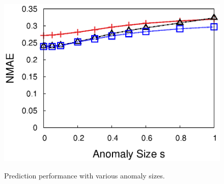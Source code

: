 \begin{figure}[h!]
{{    \includegraphics[width=\figurewidthI]{fig/pred.AnomalySize.srmf_based_pred.tm_telos_rssi.txt.1000.16.1.1000.r4.period1.org.2d.elem.half.elem1.lr0.2.burst1.na0.05.noise0.thresh0.eps}
  }
  }
  \caption{Prediction performance with various anomaly sizes.}
  \label{fig:anomaly-size-prediction}
\end{figure}


